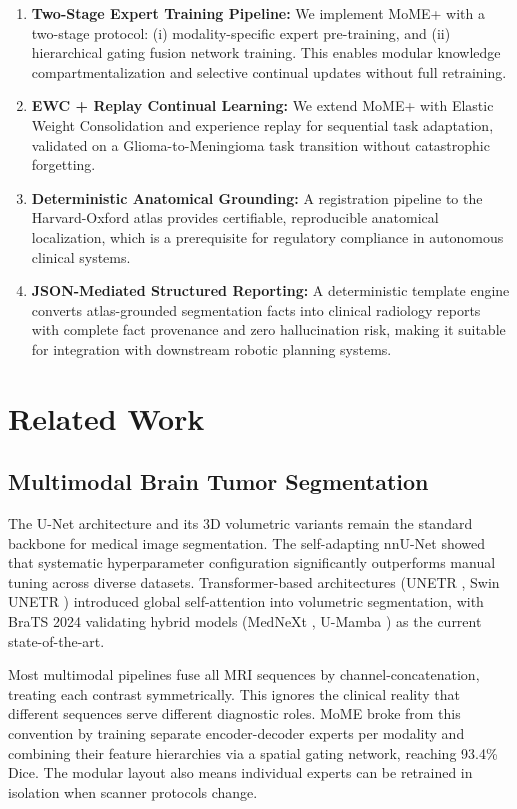 \documentclass[conference]{IEEEtran}
\begin{document}
\begin{enumerate}
    \item \textbf{Two-Stage Expert Training Pipeline:} We implement MoME+ with a two-stage protocol: (i) modality-specific expert pre-training, and (ii) hierarchical gating fusion network training. This enables modular knowledge compartmentalization and selective continual updates without full retraining.
    \item \textbf{EWC + Replay Continual Learning:} We extend MoME+ with Elastic Weight Consolidation and experience replay for sequential task adaptation, validated on a Glioma-to-Meningioma task transition without catastrophic forgetting.
    \item \textbf{Deterministic Anatomical Grounding:} A registration pipeline to the Harvard-Oxford atlas provides certifiable, reproducible anatomical localization, which is a prerequisite for regulatory compliance in autonomous clinical systems.
    \item \textbf{JSON-Mediated Structured Reporting:} A deterministic template engine converts atlas-grounded segmentation facts into clinical radiology reports with complete fact provenance and zero hallucination risk, making it suitable for integration with downstream robotic planning systems.
\end{enumerate}

\section{Related Work}

\subsection{Multimodal Brain Tumor Segmentation}
The U-Net architecture \cite{ronneberger2015unet} and its 3D volumetric variants remain the standard backbone for medical image segmentation. The self-adapting nnU-Net \cite{isensee2021nnu} showed that systematic hyperparameter configuration significantly outperforms manual tuning across diverse datasets. Transformer-based architectures (UNETR \cite{hatamizadeh2022unetr}, Swin UNETR \cite{hatamizadeh2022swin}) introduced global self-attention into volumetric segmentation, with BraTS 2024 validating hybrid models (MedNeXt \cite{roy2024mednext}, U-Mamba \cite{ma2024umamba}) as the current state-of-the-art.

Most multimodal pipelines fuse all MRI sequences by channel-concatenation, treating each contrast symmetrically. This ignores the clinical reality that different sequences serve different diagnostic roles. MoME \cite{zhang2024mome} broke from this convention by training separate encoder-decoder experts per modality and combining their feature hierarchies via a spatial gating network, reaching 93.4\% Dice. The modular layout also means individual experts can be retrained in isolation when scanner protocols change.
\end{document}
